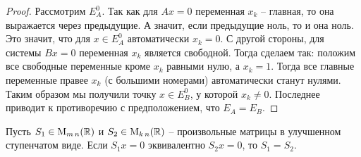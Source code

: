 \begin{proof}
Рассмотрим $E_A^0$. Так как для $Ax = 0$ переменная $x_k$ -- главная, то она выражается через предыдущие. А значит, если предыдущие ноль, то и она ноль. Это значит, что для $x\in E_A^0$ автоматически $x_k = 0$. С другой стороны, для системы $Bx = 0$ переменная $x_k$ является свободной. Тогда сделаем так: положим все свободные переменные кроме $x_k$ равными нулю, а $x_k=1$. Тогда все главные переменные правее $x_k$ (с большими номерами) автоматически станут нулями. Таким образом мы получили точку $x\in E_B^0$, у которой $x_k\neq 0$. Последнее приводит к противоречию с предположением, что $E_A = E_B$.
\end{proof}

\begin{claim}
Пусть $S_1\in\operatorname{M}_{m\,n}(\mathbb R)$ и $S_2\in\operatorname{M}_{k\,n}(\mathbb R)$ -- произвольные матрицы в улучшенном ступенчатом виде. Если $S_1x = 0$ эквивалентно $S_2x=0$, то $S_1 = S_2$.
\end{claim}
